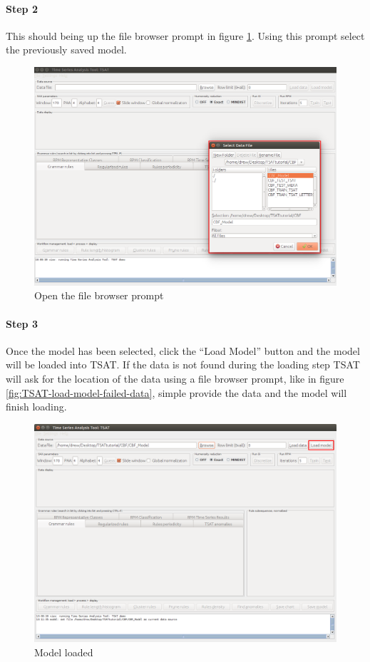 \documentclass[titlepage, letterpaper, 12pt]{article}
\begin{document}
\newpage
\paragraph{Step 2}
This should being up the file browser prompt in figure \ref{fig:TSAT-load-model-step-2}. Using this prompt select the previously saved model.

\begin{figure}[H]
	\includegraphics[width=\textwidth]{TSAT-load-model-step-2}
	\caption{Open the file browser prompt}
	\label{fig:TSAT-load-model-step-2}
\end{figure}

\newpage
\paragraph{Step 3}
Once the model has been selected, click the ``Load Model'' button and the model will be loaded into TSAT. If the data is not found during the loading step TSAT will ask for the location of the data using a file browser prompt, like in figure \ref{fig:TSAT-load-model-failed-data}, simple provide the data and the model will finish loading. 

\begin{figure}[H]
	\includegraphics[width=\textwidth]{TSAT-load-model-step-3}
	\caption{Model loaded}
	\label{fig:TSAT-load-model-step-3}
\end{figure}
\end{document}
